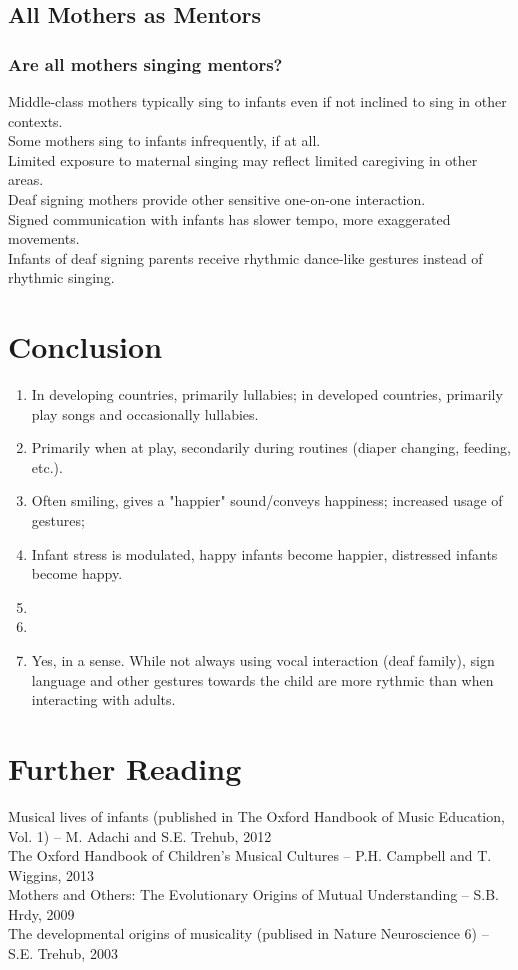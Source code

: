 \documentclass{beamer}
\begin{document}
\subsection*{All Mothers as Mentors}
\begin{frame}
	\frametitle{Are all mothers singing mentors?}
	Middle-class mothers typically sing to infants even if not inclined to sing in other contexts.\\
	Some mothers sing to infants infrequently, if at all.\\
	Limited exposure to maternal singing may reflect limited caregiving in other areas.\\
	\pause %
	Deaf signing mothers provide other sensitive one-on-one interaction.\\
	Signed communication with infants has slower tempo, more exaggerated movements.\\
	Infants of deaf signing parents receive rhythmic dance-like gestures instead of rhythmic singing.\\
\end{frame}

\section{Conclusion}
\begin{frame}
	\begin{enumerate}
		\item In developing countries, primarily lullabies; in developed countries, primarily play songs and occasionally lullabies.
		\item Primarily when at play, secondarily during routines (diaper changing, feeding, etc.).
		\item Often smiling, gives a "happier" sound/conveys happiness; increased usage of gestures; %
		\item Infant stress is modulated, happy infants become happier, distressed infants become happy.
		\item %
		\item %
		\item Yes, in a sense. While not always using vocal interaction (deaf family), sign language and other gestures towards the child are more rythmic than when interacting with adults.
	\end{enumerate}
\end{frame}

\section{Further Reading}
\begin{frame}
	Musical lives of infants (published in The Oxford Handbook of Music Education, Vol. 1) -- M. Adachi and S.E. Trehub, 2012\\
	The Oxford Handbook of Children's Musical Cultures -- P.H. Campbell and T. Wiggins, 2013\\
	Mothers and Others: The Evolutionary Origins of Mutual Understanding -- S.B. Hrdy, 2009\\
	The developmental origins of musicality (publised in Nature Neuroscience 6) -- S.E. Trehub, 2003
\end{frame}
\end{document}
